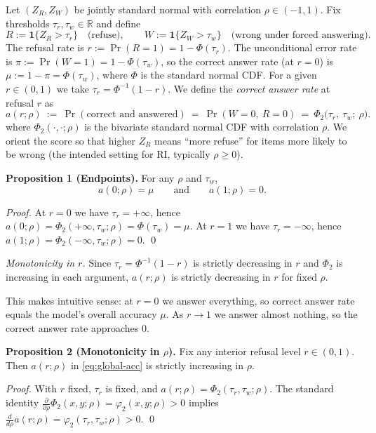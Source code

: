 Let \((Z_R,Z_W)\) be jointly standard normal with correlation \(\rho\in(-1,1)\).
Fix thresholds \(\tau_r,\tau_w\in\mathbb R\) and define
\[
R := \mathbf{1}\{Z_R>\tau_r\}\quad\text{(refuse)},\qquad
W := \mathbf{1}\{Z_W>\tau_w\}\quad\text{(wrong under forced answering)}.
\]
The refusal rate is \(r:=\Pr(R=1)=1-\Phi(\tau_r)\).
The unconditional error rate is \(\pi:=\Pr(W=1)=1-\Phi(\tau_w)\), so the correct answer rate (at \(r=0\)) is \(\mu:=1-\pi=\Phi(\tau_w)\), where \(\Phi\) is the standard normal CDF.
For a given \(r\in(0,1)\) we take \(\tau_r=\Phi^{-1}(1-r)\).
We define the \emph{correct answer rate} at refusal \(r\) as
\begin{equation}
\label{eq:global-acc}
a(r;\rho)\ :=\ \Pr(\text{correct and answered})
\ =\ \Pr(W=0,\ R=0)
\ =\ \Phi_2\!\bigl(\tau_r,\ \tau_w;\ \rho\bigr).
\end{equation}
where \(\Phi_2(\cdot,\cdot;\rho)\) is the bivariate standard normal CDF with correlation \(\rho\).
We orient the score so that higher \(Z_R\) means ``more refuse'' for items more likely to be wrong (the intended setting for RI, typically \(\rho\ge 0\)).

\textbf{Proposition 1 (Endpoints).}
For any \(\rho\) and \(\tau_w\),
\[
a(0;\rho)=\mu\qquad\text{and}\qquad a(1;\rho)=0.
\]

\emph{Proof.}
At \(r=0\) we have \(\tau_r=+\infty\), hence
\(
a(0;\rho)=\Phi_2(+\infty,\tau_w;\rho)=\Phi(\tau_w)=\mu.
\)
At \(r=1\) we have \(\tau_r=-\infty\), hence
\(
a(1;\rho)=\Phi_2(-\infty,\tau_w;\rho)=0.
\)
\qed

\emph{Monotonicity in \(r\).}
Since \(\tau_r=\Phi^{-1}(1-r)\) is strictly decreasing in \(r\) and \(\Phi_2\) is increasing in each argument, \(a(r;\rho)\) is strictly decreasing in \(r\) for fixed \(\rho\).

This makes intuitive sense:
at \(r=0\) we answer everything, so correct answer rate equals the model's overall accuracy \(\mu\).
As \(r\to 1\) we answer almost nothing, so the correct answer rate approaches \(0\).

\textbf{Proposition 2 (Monotonicity in \(\rho\)).}
Fix any interior refusal level \(r\in(0,1)\).
Then \(a(r;\rho)\) in \eqref{eq:global-acc} is strictly increasing in \(\rho\).

\emph{Proof.}
With \(r\) fixed, \(\tau_r\) is fixed, and
\(
a(r;\rho)=\Phi_2(\tau_r,\tau_w;\rho).
\)
The standard identity
\(
\frac{\partial}{\partial \rho}\Phi_2(x,y;\rho)=\varphi_2(x,y;\rho)>0
\)
 implies
\(
\frac{d}{d\rho}a(r;\rho)=\varphi_2(\tau_r,\tau_w;\rho)>0.
\)
\qed

